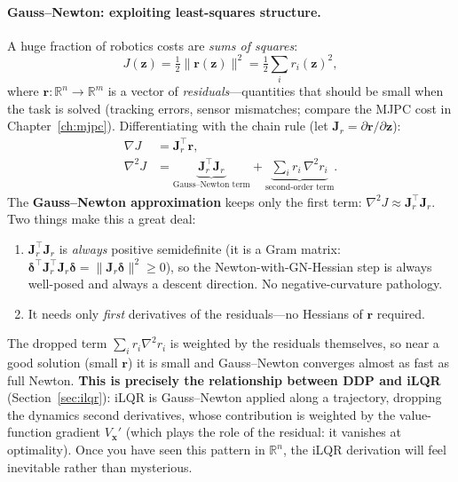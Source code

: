 \documentclass[11pt,twoside]{report}
\theoremstyle{definition}
\theoremstyle{plain}
\theoremstyle{remark}
\newcommand{\R}{\mathbb{R}}
\newcommand{\x}{\bm{x}}
\newcommand{\rr}{\bm{r}}
\newcommand{\0}{\bm{0}}
\newcommand{\J}{\bm{J}}
\begin{document}
\paragraph{Gauss--Newton: exploiting least-squares structure.}
A huge fraction of robotics costs are \emph{sums of squares}:
\begin{equation}\label{eq:least-squares}
J(\bm{z})=\tfrac12\|\rr(\bm{z})\|^{2}
=\tfrac12\sum_{i}r_{i}(\bm{z})^{2},
\end{equation}
where $\rr:\R^{n}\to\R^{m}$ is a vector of \emph{residuals}---quantities
that should be small when the task is solved (tracking errors, sensor
mismatches; compare the MJPC cost in Chapter~\ref{ch:mjpc}).
Differentiating with the chain rule (let $\J_{r}=\partial\rr/\partial\bm{z}$):
\begin{align}
\nabla J&=\J_{r}^{\!\top}\rr,\\
\nabla^{2}J&=\underbrace{\J_{r}^{\!\top}\J_{r}}_{\text{Gauss--Newton term}}
+\underbrace{\textstyle\sum_{i}r_{i}\,\nabla^{2}r_{i}}_{\text{second-order term}}.
\end{align}
The \textbf{Gauss--Newton approximation} keeps only the first term:
$\nabla^{2}J\approx\J_{r}^{\!\top}\J_{r}$. Two things make this a great deal:
\begin{enumerate}
\item $\J_{r}^{\!\top}\J_{r}$ is \emph{always} positive semidefinite
      (it is a Gram matrix: $\bm{\delta}^{\!\top}\J_{r}^{\!\top}\J_{r}\bm{\delta}
      =\|\J_{r}\bm{\delta}\|^{2}\ge 0$), so the Newton-with-GN-Hessian step
      is always well-posed and always a descent direction.
      No negative-curvature pathology.
\item It needs only \emph{first} derivatives of the residuals---no
      Hessians of $\rr$ required.
\end{enumerate}
The dropped term $\sum_{i}r_{i}\nabla^{2}r_{i}$ is weighted by the
residuals themselves, so near a good solution (small $\rr$) it is small
and Gauss--Newton converges almost as fast as full Newton.
\textbf{This is precisely the relationship between DDP and iLQR}
(Section~\ref{sec:ilqr}): iLQR is Gauss--Newton applied along a
trajectory, dropping the dynamics second derivatives, whose contribution
is weighted by the value-function gradient $V_{\x}'$ (which plays the role
of the residual: it vanishes at optimality).
Once you have seen this pattern in $\R^{n}$, the iLQR derivation will
feel inevitable rather than mysterious.

\end{document}
